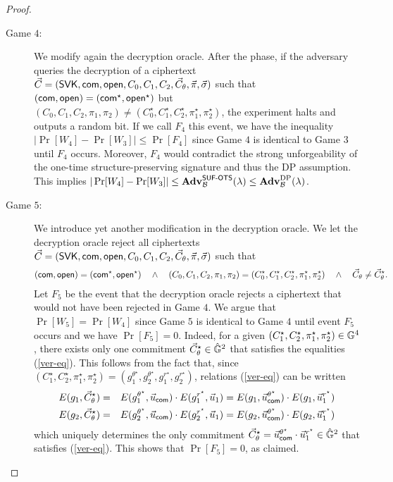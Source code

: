 \begin{proof}
\begin{description}
\item[\textsf{Game} $4$:] We modify again the decryption oracle. After the phase, if the adversary queries the decryption of a ciphertext 
 $ \vec{C} = (\mathsf{SVK}, \mathsf{com}, \mathsf{open}, C_0, C_1, C_2, \vec{C}_{\theta}, \vec{\pi}, \vec{\sigma})  $ such that $(\mathsf{com},\mathsf{open})=(\mathsf{com}^\star,\mathsf{open}^\star)$
but $(C_0,C_1,C_2,\pi_1,\pi_2) \neq (C_0^\star,C_1^\star,C_2^\star,\pi_1^\star,\pi_2^\star)$, the experiment halts and outputs a random 
bit. If we call $F_4$ this event, we have the inequality  $|\Pr[W_4]-\Pr[W_3]| \leq \Pr[F_4]$ since Game $4$ is identical to Game $3$ until $F_4$ occurs.
 Moreover,   $F_4$ would contradict the strong unforgeability of the one-time structure-preserving signature  and thus the DP assumption. This implies  
$|\Pr[W_4]-\Pr[W_3]| \leq \mathbf{Adv}_{\mathcal{B}}^{\mathsf{SUF}\textsf{-}\mathsf{OTS}}(\lambda)   \leq   \mathbf{Adv}_{\mathcal{B}}^{\mathrm{DP}}(\lambda)$.
 \smallskip \smallskip 

\item[\textsf{Game} $5$:] We introduce yet another modification in the decryption oracle.  We let the decryption oracle reject all ciphertexts $ \vec{C} = (\mathsf{SVK}, \mathsf{com}, \mathsf{open}, C_0, C_1, C_2, \vec{C}_{\theta}, \vec{\pi}, \vec{\sigma})  $ 
such that
\begin{eqnarray} \label{event-F5}
(\mathsf{com},\mathsf{open})=(\mathsf{com}^\star,\mathsf{open}^\star)  \quad \wedge \quad (C_0,C_1,C_2,\pi_1,\pi_2) = (C_0^\star,C_1^\star,C_2^\star,\pi_1^\star,\pi_2^\star) 
 \quad \wedge \quad \vec{C}_{\theta} \neq \vec{C}_{\theta}^\star .
\end{eqnarray}  
  Let $F_5$ be the event that the decryption oracle rejects a ciphertext that would not have been rejected in Game $4$.   
We argue that $\Pr[W_5] = \Pr[W_4]$ since Game $5$ is identical to Game $4$ until event $F_5$ occurs and we have $\Pr[F_5]=0$. 
 Indeed, 
for a given $(C_1^\star,C_2^\star,\pi_1^\star,\pi_2^\star) \in \mathbb{G}^4$, there exists only one commitment $\vec{C}_{\theta}^\star \in \hat{\mathbb{G}}^2$ that satisfies the equalities (\ref{ver-eq}). This follows from the fact that, since  
$(C_1^\star,C_2^\star,\pi_1^\star,\pi_2^\star)=(g_1^{\theta^\star},g_2^{\theta^\star},g_1^{r^\star},g_2^{r^\star})$, relations 
 (\ref{ver-eq}) can be written
			\begin{eqnarray*}  
			E(g_1,\vec{C}_{\theta}^\star) &=& E(g_1^{\theta^\star} , \vec{u}_{\mathsf{com}}) \cdot E(g_1^{r^\star},\vec{u}_1) = E(g_1 , \vec{u}_{\mathsf{com}}^{\theta^\star}) \cdot E(g_1,\vec{u}_1^{r^\star}) \\ \nonumber
			E(g_2,\vec{C}_{\theta}^\star) &=& E(g_2^{\theta^\star} , \vec{u}_{\mathsf{com}}) \cdot E(g_2^{r^\star},\vec{u}_1) =E(g_2 , \vec{u}_{\mathsf{com}}^{\theta^\star}) \cdot E(g_2,\vec{u}_1^{r^\star})
			\end{eqnarray*}
which uniquely determines the  only commitment $\vec{C}_{\theta}^\star=\vec{u}_{\mathsf{com}}^{\theta^\star} \cdot \vec{u}_1^{r^\star} \in \hat{\mathbb{G}}^2$ that satisfies (\ref{ver-eq}). 
 This shows that $\Pr[F_5] = 0$, as claimed. 
   \smallskip \smallskip 






\end{description}
\end{proof}
